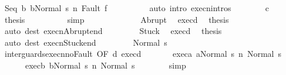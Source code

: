 \begin{isabellebody}
\ {\isachardoublequoteopen}{\isasymGamma}{\isasymturnstile}{\isasymlangle}Seq\ b{}\ b{}{\isacharcomma}Normal\ s{\isasymrangle}\ {\isacharequal}n{\isasymRightarrow}\ Fault\ f{\isachardoublequoteclose}\isanewline
\ \ \ \ \ \ \ \ \isamarkupfalse%
\ {\isacharparenleft}auto\ intro{\isacharcolon}\ execn{\isachardot}intros{\isacharparenright}\isanewline
\ \ \ \ \ \ \isamarkupfalse%
\ c{}\ \isamarkupfalse%
\ {\isacharquery}thesis\isanewline
\ \ \ \ \ \ \ \ \isamarkupfalse%
\ simp\isanewline
\ \ \ \ \isamarkupfalse%
\isanewline
\ \ \isamarkupfalse%
\isanewline
\ \ \ \ \isamarkupfalse%
\ Abrupt\ \isamarkupfalse%
\ exec{\isacharunderscore}d{}\ \isamarkupfalse%
\ {\isacharquery}thesis\ \isamarkupfalse%
\ {\isacharparenleft}auto\ dest{\isacharcolon}\ execn{\isacharunderscore}Abrupt{\isacharunderscore}end{\isacharparenright}\isanewline
\ \ \isamarkupfalse%
\isanewline
\ \ \ \ \isamarkupfalse%
\ Stuck\ \isamarkupfalse%
\ exec{\isacharunderscore}d{}\ \isamarkupfalse%
\ {\isacharquery}thesis\ \isamarkupfalse%
\ {\isacharparenleft}auto\ dest{\isacharcolon}\ execn{\isacharunderscore}Stuck{\isacharunderscore}end{\isacharparenright}\isanewline
\ \ \isamarkupfalse%
\isanewline
\ \ \ \ \isamarkupfalse%
\ {\isacharparenleft}Normal\ s{\isacharprime}{\isacharprime}{\isacharparenright}\ \isanewline
\ \ \ \ \isamarkupfalse%
\ inter{\isacharunderscore}guards{\isacharunderscore}execn{\isacharunderscore}noFault\ {\isacharbrackleft}OF\ d{}\ exec{\isacharunderscore}d{}{\isacharbrackright}\ \isamarkupfalse%
\isanewline
\ \ \ \ \ \ exec{\isacharunderscore}a{}{\isacharcolon}\ {\isachardoublequoteopen}{\isasymGamma}{\isasymturnstile}{\isasymlangle}a{}{\isacharcomma}Normal\ s{\isasymrangle}\ {\isacharequal}n{\isasymRightarrow}\ Normal\ s{\isacharprime}{\isacharprime}{\isachardoublequoteclose}\ \isanewline
\ \ \ \ \ \ exec{\isacharunderscore}b{}{\isacharcolon}\ {\isachardoublequoteopen}{\isasymGamma}{\isasymturnstile}{\isasymlangle}b{}{\isacharcomma}Normal\ s{\isasymrangle}\ {\isacharequal}n{\isasymRightarrow}\ Normal\ s{\isacharprime}{\isacharprime}{\isachardoublequoteclose}\isanewline
\ \ \ \ \ \ \isamarkupfalse%
\ simp\isanewline

\end{isabellebody}
